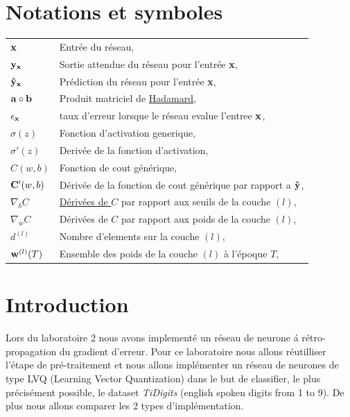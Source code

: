 \documentclass[11pt]{article}
\begin{document}
\EtsPageGenerate
\tableofcontents

\newpage
\section{Notations et symboles}
\begin{tabular}{p{1.75cm}p{10cm}}
	${\bf x}$ & Entr\'ee du r\'eseau, \\
	${\bf y_x}$ & Sortie attendue du r\'eseau pour l'entr\'ee {\bf x}, \\
	${\bf \hat y_x}$ & Pr\'ediction du r\'eseau pour l'entr\'ee {\bf x}, \\
	${\bf a} \circ {\bf b}$ & Produit matriciel de
		\href{https://en.wikipedia.org/wiki/Hadamard_product_(matrices)}
		{Hadamard}, \\
	$\epsilon_{\bf x}$ & taux d'erreur lorsque le r\'eseau evalue l'entree ${\bf x}$, \\
	$\sigma(z)$ & Fonction d'activation generique, \\
	$\sigma'(z)$ & Deriv\'ee de la fonction d'activation, \\
	$C(w, b)$ & Fonction de cout g\'en\'erique, \\
	${\bf C}'(w, b)$ & D\'eriv\'ee de la fonction de cout g\'en\'erique par
		rapport a ${\bf \hat y}$, \\
	$\nabla_bC$ & \href{https://en.wikipedia.org/wiki/Matrix_calculus}
		{D\'eriv\'ees de $C$} par rapport aux seuils de la couche $(l)$, \\
	$\nabla_wC$ & D\'eriv\'ees de $C$ par rapport aux poids de la couche $(l)$, \\
	$d^{(l)}$ & Nombre d'elements sur la couche $(l)$, \\
	${\bf w}^{(l)}(T)$ & Ensemble des poids de la couche $(l)$ \`a l'\'epoque $T$, \\
\end{tabular}
\newpage



\section{Introduction}
Lors du laboratoire 2 nous avons implement\'e un r\'eseau de neurone \'a r\'etro-propagation du gradient d’erreur. Pour ce laboratoire nous allons r\'eutilliser l'étape de pré-traitement et nous 
allons implémenter un r\'eseau de neurones de type LVQ (Learning Vector Quantization) dans le but de classifier, le plus précisément possible,
le dataset {\em TiDigits} (english spoken digits from 1 to 9). De plus nous allons comparer les 2 types d'impl\'ementation.
\end{document}
